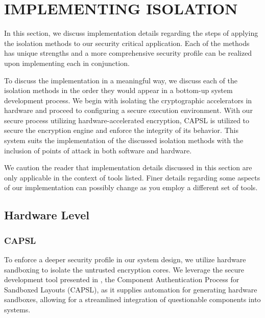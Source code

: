 \documentclass[sigconf]{acmart}
\theoremstyle{plain}
\theoremstyle{remark}
\begin{document}
\section{IMPLEMENTING ISOLATION} \label{sec:Implementation}
In this section, we discuss implementation details regarding the steps of applying the isolation methods to our security critical application. Each of the methods has unique strengths and a more comprehensive security profile can be realized upon implementing each in conjunction.

To discuss the implementation in a meaningful way, we discuss each of the isolation methods in the order they would appear in a bottom-up system development process. We begin with isolating the cryptographic accelerators in hardware and proceed to configuring a secure execution environment. With our secure process utilizing hardware-accelerated encryption, CAPSL is utilized to secure the encryption engine and enforce the integrity of its behavior. This system suits the implementation of the discussed isolation methods with the inclusion of points of attack in both software and hardware.

We caution the reader that implementation details discussed in this section are only applicable in the context of tools listed. Finer details regarding some aspects of our implementation can possibly change as you employ a different set of tools.

\subsection{Hardware Level} \label{sec:hardware}
\subsubsection{CAPSL}
To enforce a deeper security profile in our system design, we utilize hardware sandboxing to isolate the untrusted encryption cores. We leverage the secure development tool presented in \cite{CAPSL}, the Component Authentication Process for Sandboxed Layouts (CAPSL), as it supplies automation for generating hardware sandboxes, allowing for a streamlined integration of questionable components into systems.
\end{document}
